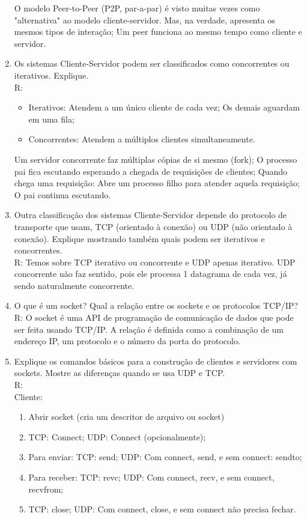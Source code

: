\documentclass{article}
\begin{document}
\begin{enumerate}
O modelo Peer-to-Peer (P2P, par-a-par) é visto muitas vezes como "alternativa" ao modelo
cliente-servidor. Mas, na verdade, apresenta os mesmos tipos de interação; Um
peer funciona ao mesmo tempo como cliente e servidor.\\



	\item Os sistemas Cliente-Servidor podem ser classificados como concorrentes ou iterativos. Explique.
	\\
	R:
\begin{itemize}
	\item Iterativos: Atendem a um único cliente de cada vez; Os demais aguardam em
uma fila;
	\item Concorrentes: Atendem a múltiplos clientes simultaneamente.
\end{itemize}

Um servidor concorrente faz múltiplas cópias de si mesmo (fork); O processo pai fica
escutando esperando a chegada de requisições de clientes; Quando chega uma requisição:
Abre um processo filho para atender aquela requisição; O pai continua escutando.\\



	\item Outra classificação dos sistemas Cliente-Servidor depende do protocolo de transporte que usam, TCP (orientado à conexão) ou UDP (não orientado à conexão). Explique mostrando também quais podem ser iterativos e concorrentes.
	\\
	R:
	Temos sobre TCP iterativo ou concorrente e UDP apenas iterativo. UDP concorrente não faz
	sentido, pois ele processa 1 datagrama de cada vez, já sendo naturalmente concorrente.

	
	\item O que é um socket? Qual a relação entre os sockets e os protocolos TCP/IP?
	\\R: O socket é uma API de programação de comunicação de dados que pode ser feita usando TCP/IP. A relação é definida como a combinação de um endereço IP, um protocolo e o número da porta do protocolo.
	

	\item Explique os comandos básicos para a construção de clientes e servidores com sockets. Mostre as diferenças quando se usa UDP e TCP.
   \\R:\\
   Cliente:

      \begin{enumerate}
         \item Abrir socket (cria um descritor de arquivo ou socket)
         \item TCP: Connect; UDP: Connect (opcionalmente);
         \item Para enviar: TCP: send; UDP: Com connect, send, e sem connect: sendto;
         \item Para receber: TCP: revc; UDP: Com connect, recv, e sem connect, recvfrom;
         \item TCP: close; UDP: Com connect, close, e sem connect não precisa fechar.
      \end{enumerate}


\end{enumerate}
\end{document}

